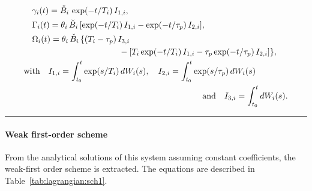 \begin{table}[htbp]
\begin{align}
& \quad \gamma _i(t) = \Check{B}_i\,\exp(-t/T_i)
\,I_{1,i}, \label{eq:lagr:num_scheme:gammaN_exa}\\
& \quad \Gamma _i(t) = \theta_i \,\Check{B}_i\,
 [\exp(-t/T_i)\,I_{1,i} -\exp(-t/\tau_p)\,I_{2,i}], \label{eq:lagr:num_scheme:GammaN_exa}\\
& \quad \Omega _i(t) = \theta_i \,\Check{B}_i\,
   \{ (T_i-\tau_p)\,I_{3,i} \notag \\
& \hskip 4.0cm -[T_i \exp(-t/T_i)\,I_{1,i} -
   \tau_p \exp(-t/\tau_p) \,I_{2,i}]\}, \label{eq:lagr:num_scheme:OmegaN_exa} \\
& \text{with} \quad I_{1,i} = \int_{t_0}^{t}\exp(s/T_i)\,dW_i(s),
\quad I_{2,i}= \int_{t_0}^{t}\exp(s/\tau_p)\,dW_i(s) \notag \\
& \hskip 7.5cm \text{and} \quad I_{3,i}=\int_{t_0}^{t}dW_i(s).\notag
\end{align}
\hrule
\label{tab:lagrangian:exa}
\end{table}

\paragraph{Weak first-order scheme} From the analytical solutions of this system assuming constant coefficients, the weak-first order scheme is extracted. The equations are described in Table~\ref{tab:lagrangian:sch1}.

